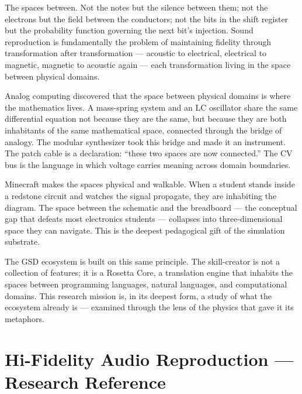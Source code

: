 \documentclass[11pt,letterpaper]{article}
\newcommand{\stageheader}[2]{%
  \noindent\colorbox{#2}{\makebox[\textwidth][l]{%
    \textcolor{white}{\bfseries\sffamily\hspace{6pt}#1\hspace{6pt}}}}%
  \vspace{0.5em}\par%
}
\begin{document}
The spaces between. Not the notes but the silence between them; not the electrons but the field between the conductors; not the bits in the shift register but the probability function governing the next bit's injection. Sound reproduction is fundamentally the problem of maintaining fidelity through transformation after transformation --- acoustic to electrical, electrical to magnetic, magnetic to acoustic again --- each transformation living in the space between physical domains.

Analog computing discovered that the space between physical domains is where the mathematics lives. A mass-spring system and an LC oscillator share the same differential equation not because they are the same, but because they are both inhabitants of the same mathematical space, connected through the bridge of analogy. The modular synthesizer took this bridge and made it an instrument. The patch cable is a declaration: ``these two spaces are now connected.'' The CV bus is the language in which voltage carries meaning across domain boundaries.

Minecraft makes the spaces physical and walkable. When a student stands inside a redstone circuit and watches the signal propagate, they are inhabiting the diagram. The space between the schematic and the breadboard --- the conceptual gap that defeats most electronics students --- collapses into three-dimensional space they can navigate. This is the deepest pedagogical gift of the simulation substrate.

The GSD ecosystem is built on this same principle. The skill-creator is not a collection of features; it is a Rosetta Core, a translation engine that inhabits the spaces between programming languages, natural languages, and computational domains. This research mission is, in its deepest form, a study of what the ecosystem already is --- examined through the lens of the physics that gave it its metaphors.

\newpage

\stageheader{STAGE 2 --- RESEARCH REFERENCE}{secondary}

\section{Hi-Fidelity Audio Reproduction --- Research Reference}
\end{document}
